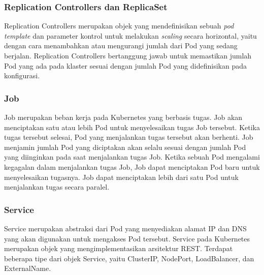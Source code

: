 \subsubsection{Replication Controllers dan ReplicaSet}

Replication Controllers merupakan objek yang mendefinisikan sebuah \emph{pod template}
dan parameter kontrol untuk melakukan \emph{scaling} secara horizontal, yaitu dengan
cara menambahkan atau mengurangi jumlah dari Pod yang sedang berjalan. Replication
Controllers bertanggung jawab untuk memastikan jumlah Pod yang ada pada klaster
sesuai dengan jumlah Pod yang didefinisikan pada konfigurasi.

\subsubsection{Job}

Job merupakan beban kerja pada Kubernetes yang berbasis tugas. Job akan menciptakan
satu atau lebih Pod untuk menyelesaikan tugas Job tersebut. Ketika tugas tersebut
selesai, Pod yang menjalankan tugas tersebut akan berhenti. Job menjamin jumlah
Pod yang diciptakan akan selalu sesuai dengan jumlah Pod yang diinginkan pada
saat menjalankan tugas Job. Ketika sebuah Pod mengalami kegagalan dalam menjalankan
tugas Job, Job dapat menciptakan Pod baru untuk menyelesaikan tugasnya. Job dapat
menciptakan lebih dari satu Pod untuk menjalankan tugas secara paralel.

\subsubsection{Service}

Service merupakan abstraksi dari Pod yang menyediakan alamat IP dan DNS yang
akan digunakan untuk mengakses Pod tersebut. Service pada Kubernetes merupakan
objek yang mengimplementasikan arsitektur REST. Terdapat beberapa tipe dari objek
Service, yaitu ClusterIP, NodePort, LoadBalancer, dan ExternalName.

